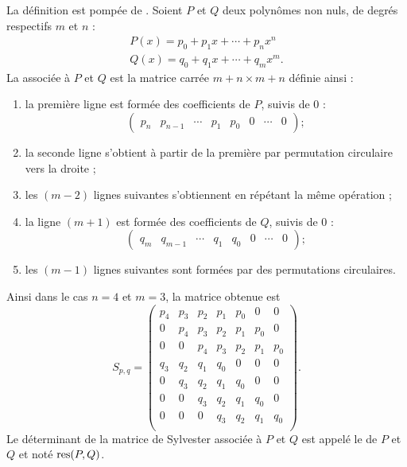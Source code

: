 La définition est pompée de . Soient \( P\) et \( Q\) deux polynômes non nuls, de degrés respectifs \( m\) et \( n\) :
\begin{subequations}
    \begin{align}
        P(x)=p_0+p_1x+\cdots +p_nx^n\\
        Q(x)=q_0+q_1x+\cdots +q_mx^m.
    \end{align}
\end{subequations}
La  associée à \( P\) et \( Q\) est la matrice carrée \( m+n\times m+n\) définie ainsi :
\begin{enumerate}
    \item
la première ligne est formée des coefficients de \( P\), suivis de 0 :
\begin{equation}
\begin{pmatrix} p_n & p_{n-1} & \cdots & p_1 & p_0 & 0 & \cdots & 0 \end{pmatrix} ;
\end{equation}
\item la seconde ligne s'obtient à partir de la première par permutation circulaire vers la droite ;
\item les $(m-2)$ lignes suivantes s'obtiennent en répétant la même opération ;
\item la ligne $(m+1)$ est formée des coefficients de \( Q\), suivis de 0 :
    \begin{equation}
    \begin{pmatrix} q_m & q_{m-1} & \cdots & q_1 & q_0 & 0 & \cdots & 0 \end{pmatrix} ;
    \end{equation}
    \item les $(m-1)$ lignes suivantes sont formées par des permutations circulaires.
\end{enumerate}

Ainsi dans le cas $n=4$ et $m=3$, la matrice obtenue est
\begin{equation}    \label{EqPEgtle}
S_{p,q}=\begin{pmatrix}
p_4 & p_3 & p_2 & p_1 & p_0 & 0 & 0 \\
0 & p_4 & p_3 & p_2 & p_1 & p_0 & 0 \\
0 & 0 & p_4 & p_3 & p_2 & p_1 & p_0 \\
q_3 & q_2 & q_1 & q_0 & 0 & 0 & 0 \\
0 & q_3 & q_2 & q_1 & q_0 & 0 & 0 \\
0 & 0 & q_3 & q_2 & q_1 & q_0 & 0 \\
0 & 0 & 0 & q_3 & q_2 & q_1 & q_0 \\
\end{pmatrix}.
\end{equation}
Le déterminant de la matrice de Sylvester associée à \( P\) et \( Q\) est appelé le  de \( P\) et \( Q\) et noté \( \operatorname{res}(P,Q)\).

